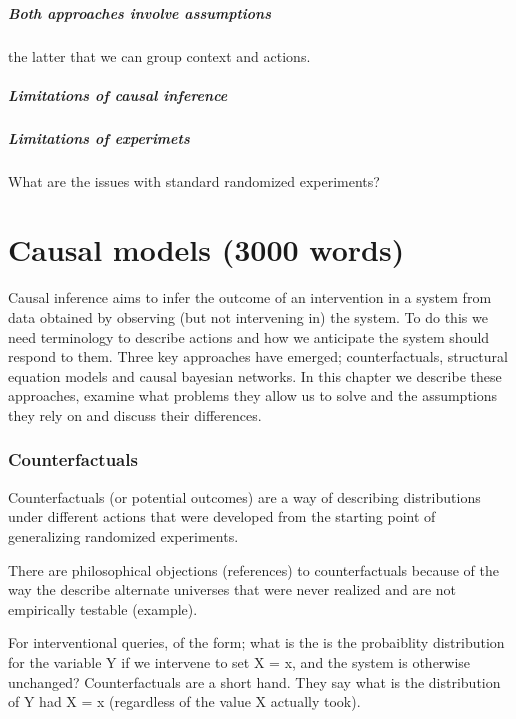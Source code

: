 \documentclass[11pt,a4paper,oneside]{book}
\begin{document}
\paragraph*{Both approaches involve assumptions} the latter that we can group context and actions.

\paragraph*{Limitations of causal inference}

\paragraph*{Limitations of experimets} What are the issues with standard randomized experiments?

\chapter*{Causal models (3000 words)}

Causal inference aims to infer the outcome of an intervention in a system from data obtained by observing (but not intervening in) the system. To do this we need terminology to describe actions and how we anticipate the system should respond to them. Three key approaches have emerged; counterfactuals, structural equation models and causal bayesian networks. In this chapter we describe these approaches, examine what problems they allow us to solve and the assumptions they rely on and discuss their differences.

\subsection*{Counterfactuals}
Counterfactuals (or potential outcomes) are a way of describing distributions under different actions that were developed from the starting point of generalizing randomized experiments. 


There are philosophical objections (references) to counterfactuals because of the way the describe alternate universes that were never realized and are not empirically testable (example). 

For interventional queries, of the form; what is the is the probaiblity distribution for the variable Y if we intervene to set X = x, and the system is otherwise unchanged? Counterfactuals are a short hand. They say what is the distribution of Y had X = x (regardless of the value X actually took).
\end{document}
